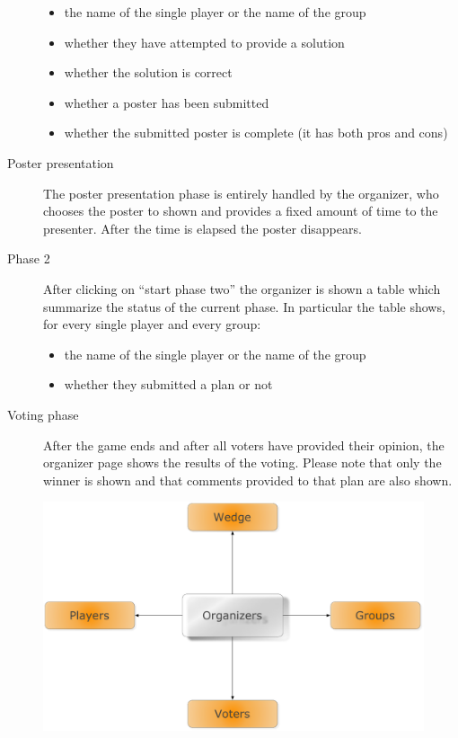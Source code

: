 \begin{description}
\begin{itemize}
		\item the name of the single player or the name of the group
		\item whether they have attempted to provide a solution
		\item whether the solution is correct
		\item whether a poster has been submitted
		\item whether the submitted poster is complete (it has both pros and cons)
	\end{itemize}
	\item[Poster presentation] The poster presentation phase is entirely handled by the organizer, who chooses the poster to shown and provides a fixed amount of time to the presenter. After the time is elapsed the poster disappears.
	\item[Phase 2] After clicking on ``start phase two'' the organizer is shown a table which summarize the status of the current phase. In particular the table shows, for every single player and every group:
	\begin{itemize}
		\item the name of the single player or the name of the group
		\item whether they submitted a plan or not
	\end{itemize}
	\item[Voting phase] After the game ends and after all voters have provided their opinion, the organizer page shows the results of the voting. Please note that only the winner is shown and that comments provided to that plan are also shown.
\end{description}
    \begin{figure}[htbp]
    \begin{center}
      \includegraphics[width=12cm]{../img/Organizer.pdf}
    \end{center}
  \end{figure}

